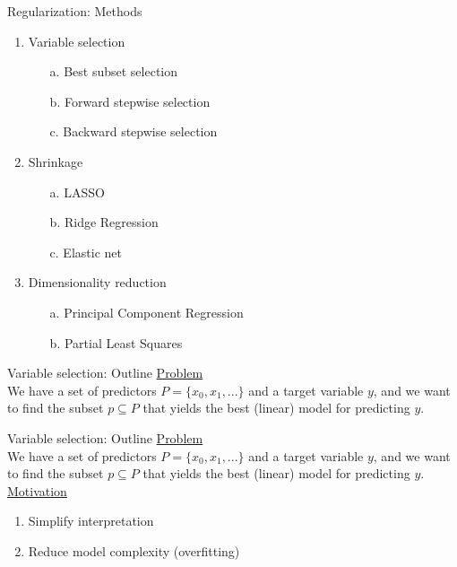 \documentclass[8pt]{beamer}
\begin{document}
    \begin{frame}{Regularization: Methods}
        \begin{enumerate}
            \item Variable selection
            \begin{enumerate}
                \item[a.] Best subset selection
                \item[b.] Forward stepwise selection
                \item[c.] Backward stepwise selection
            \end{enumerate}
            \item Shrinkage
            \begin{enumerate}
                \item[a.] LASSO
                \item[b.] Ridge Regression
                \item[c.] Elastic net
            \end{enumerate}
            \item Dimensionality reduction
            \begin{enumerate}
                \item[a.] Principal Component Regression
                \item[b.] Partial Least Squares
            \end{enumerate}
        \end{enumerate}
    \end{frame}

    \begin{frame}[t]{Variable selection: Outline} %
        \underline{Problem}\\
        We have a set of predictors $P=\{x_0, x_1, ...\}$ and a target variable $y$, and we want to find the subset $p \subseteq P$ that yields the best (linear) model for predicting $y$.\\
    \end{frame}

    \begin{frame}[t]{Variable selection: Outline} %
        \underline{Problem}\\
        We have a set of predictors $P=\{x_0, x_1, ...\}$ and a target variable $y$, and we want to find the subset $p \subseteq P$ that yields the best (linear) model for predicting $y$.\\
        \vspace{0.25cm}
        \underline{Motivation}\\
        \begin{enumerate}
            \item Simplify interpretation
            \item Reduce model complexity (overfitting)
        \end{enumerate}
    \end{frame}
\end{document}
